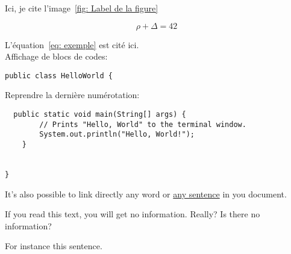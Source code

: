 \documentclass{rapportUHA40}
\begin{document}

Ici, je cite l'image~\ref{fig: Label de la figure}


\begin{equation} \label{eq: exemple}
  \rho + \Delta = 42
\end{equation}

L'équation~\ref{eq: exemple} est cité ici. \\

Affichage de blocs de codes:
\begin{verbatim}
public class HelloWorld {
\end{verbatim}

Reprendre la dernière numérotation:
\begin{verbatim}
  public static void main(String[] args) {
        // Prints "Hello, World" to the terminal window.
        System.out.println("Hello, World!");
    }


}
\end{verbatim}

It's also possible to link directly any word or \hyperlink{thesentence}{any
  sentence} in you document.

If you read this text, you will get no information. Really? Is there no
information?

For instance \hypertarget{thesentence}{this sentence}.
\end{document}
